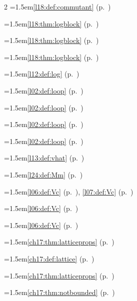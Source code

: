 \begin{multicols}{2}
\hangindent=1.5em\quad \ref{l18:def:commutant} (p.~\pageref{l18:def:commutant})\par
\hangindent=1.5em\quad \ref{l18:thm:logblock} (p.~\pageref{l18:thm:logblock})\par
\hangindent=1.5em\quad \ref{l18:thm:logblock} (p.~\pageref{l18:thm:logblock})\par
\hangindent=1.5em\quad \ref{l18:thm:logblock} (p.~\pageref{l18:thm:logblock})\par
\hangindent=1.5em\quad \ref{l12:def:log} (p.~\pageref{l12:def:log})\par
\hangindent=1.5em\quad \ref{l02:def:loop} (p.~\pageref{l02:def:loop})\par
\hangindent=1.5em\quad \ref{l02:def:loop} (p.~\pageref{l02:def:loop})\par
\hangindent=1.5em\quad \ref{l02:def:loop} (p.~\pageref{l02:def:loop})\par
\hangindent=1.5em\quad \ref{l02:def:loop} (p.~\pageref{l02:def:loop})\par
\hangindent=1.5em\quad \ref{l13:def:vhat} (p.~\pageref{l13:def:vhat})\par
\hangindent=1.5em\quad \ref{l24:def:Mm} (p.~\pageref{l24:def:Mm})\par
\hangindent=1.5em\quad \ref{l06:def:Vc} (p.~\pageref{l06:def:Vc}), \ref{l07:def:Vc} (p.~\pageref{l07:def:Vc})\par
\hangindent=1.5em\quad \ref{l06:def:Vc} (p.~\pageref{l06:def:Vc})\par
\hangindent=1.5em\quad \ref{l06:def:Vc} (p.~\pageref{l06:def:Vc})\par
\hangindent=1.5em\quad \ref{ch17:thm:latticeprops} (p.~\pageref{ch17:thm:latticeprops})\par
\hangindent=1.5em\quad \ref{ch17:def:lattice} (p.~\pageref{ch17:def:lattice})\par
\hangindent=1.5em\quad \ref{ch17:thm:latticeprops} (p.~\pageref{ch17:thm:latticeprops})\par
\hangindent=1.5em\quad \ref{ch17:thm:notbounded} (p.~\pageref{ch17:thm:notbounded})\par

\end{multicols}
